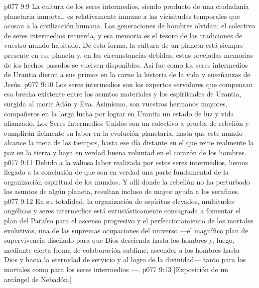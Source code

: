 \vs p077 9:9 La cultura de los seres intermedios, siendo producto de una ciudadanía planetaria inmortal, es relativamente inmune a las vicisitudes temporales que acosan a la civilización humana. Las generaciones de hombres olvidan; el colectivo de seres intermedios recuerda, y esa memoria es el tesoro de las tradiciones de vuestro mundo habitado. De esta forma, la cultura de un planeta está siempre presente en ese planeta y, en las circunstancias debidas, estas preciadas memorias de los hechos pasados se vuelven disponibles. Así fue como los seres intermedios de Urantia dieron a sus primos en la carne la historia de la vida y enseñanzas de Jesús.
\vs p077 9:10 Los seres intermedios son los expertos servidores que compensan esa brecha existente entre los asuntos materiales y los espirituales de Urantia, surgida al morir Adán y Eva. Asimismo, son vuestros hermanos mayores, compañeros en la larga lucha por lograr en Urantia un estado de luz y vida afianzado. Los Seres Intermedios Unidos son un colectivo a prueba de rebelión y cumplirán fielmente su labor en la evolución planetaria, hasta que este mundo alcance la meta de los tiempos, hasta ese día distante en el que reine realmente la paz en la tierra y haya en verdad buena voluntad en el corazón de los hombres.
\vs p077 9:11 Debido a la valiosa labor realizada por estos seres intermedios, hemos llegado a la conclusión de que son en verdad una parte fundamental de la organización espiritual de los mundos. Y allí donde la rebelión no ha perturbado los asuntos de algún planeta, resultan incluso de mayor ayuda a los serafines.
\vs p077 9:12 \pc En su totalidad, la organización de espíritus elevados, multitudes angélicas y seres intermedios está entusiásticamente consagrada a fomentar el plan del Paraíso para el ascenso progresivo y el perfeccionamiento de los mortales evolutivos, una de las supremas ocupaciones del universo ---el magnífico plan de supervivencia diseñado para que Dios descienda hasta los hombres y, luego, mediante cierta forma de colaboración sublime, ascender a los hombres hasta Dios y hacia la eternidad de servicio y al logro de la divinidad--- tanto para los mortales como para los seres intermedios ---.
\vsetoff
\vs p077 9:13 [Exposición de un arcángel de Nebadón.]
